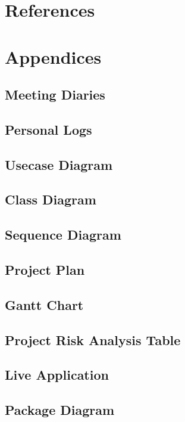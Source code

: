 \documentclass[11pt]{article}
\begin{document}
	\section{References}
	\section{Appendices}
	\subsection{Meeting Diaries} %
	\subsection{Personal Logs} %
	\subsection{Usecase Diagram} 
	\subsection{Class Diagram}
	\subsection{Sequence Diagram}
	\subsection{Project Plan} %
	\subsection{Gantt Chart}
	\subsection{Project Risk Analysis Table}
	\subsection{Live Application}
	\subsection{Package Diagram}
\end{document}
